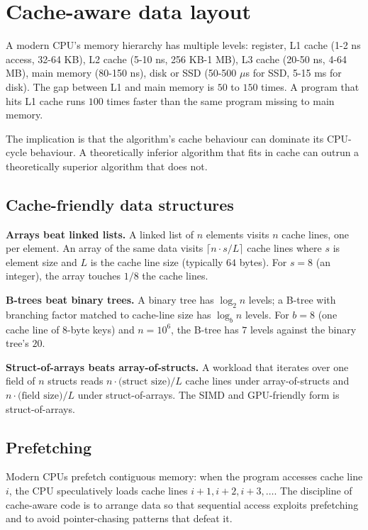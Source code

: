 \section{Cache-aware data layout}

A modern CPU's memory hierarchy has multiple levels: register, L1 cache (1-2 ns access, 32-64 KB), L2 cache (5-10 ns, 256 KB-1 MB), L3 cache (20-50 ns, 4-64 MB), main memory (80-150 ns), disk or SSD (50-500 $\mu$s for SSD, 5-15 ms for disk). The gap between L1 and main memory is $50$ to $150$ times. A program that hits L1 cache runs $100$ times faster than the same program missing to main memory.

The implication is that the algorithm's cache behaviour can dominate its CPU-cycle behaviour. A theoretically inferior algorithm that fits in cache can outrun a theoretically superior algorithm that does not.

\subsection{Cache-friendly data structures}

\textbf{Arrays beat linked lists.} A linked list of $n$ elements visits $n$ cache lines, one per element. An array of the same data visits $\lceil n \cdot s / L \rceil$ cache lines where $s$ is element size and $L$ is the cache line size (typically $64$ bytes). For $s = 8$ (an integer), the array touches $1/8$ the cache lines.

\textbf{B-trees beat binary trees.} A binary tree has $\log_2 n$ levels; a B-tree with branching factor matched to cache-line size has $\log_b n$ levels. For $b = 8$ (one cache line of $8$-byte keys) and $n = 10^6$, the B-tree has $7$ levels against the binary tree's $20$.

\textbf{Struct-of-arrays beats array-of-structs.} A workload that iterates over one field of $n$ structs reads $n \cdot \text{(struct size)} / L$ cache lines under array-of-structs and $n \cdot \text{(field size)} / L$ under struct-of-arrays. The SIMD and GPU-friendly form is struct-of-arrays.

\subsection{Prefetching}

Modern CPUs prefetch contiguous memory: when the program accesses cache line $i$, the CPU speculatively loads cache lines $i+1, i+2, i+3, \ldots$. The discipline of cache-aware code is to arrange data so that sequential access exploits prefetching and to avoid pointer-chasing patterns that defeat it.

